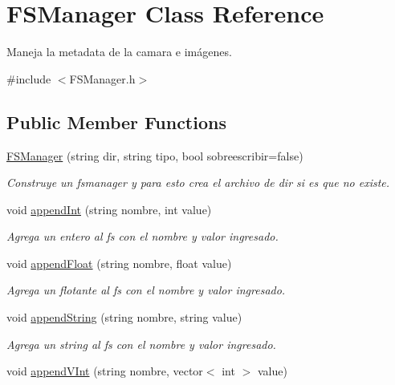 \hypertarget{classFSManager}{}\section{F\+S\+Manager Class Reference}
\label{classFSManager}


Maneja la metadata de la camara e imágenes.  




{\ttfamily \#include $<$F\+S\+Manager.\+h$>$}

\subsection*{Public Member Functions}
\begin{DoxyCompactItemize}
\item 
\mbox{\hyperlink{classFSManager_a6332022070523e78abdb3371fdb5befb}{F\+S\+Manager}} (string dir, string tipo, bool sobreescribir=false)
\begin{DoxyCompactList}\small\item\em Construye un fsmanager y para esto crea el archivo de \textquotesingle{}dir\textquotesingle{} si es que no existe. \end{DoxyCompactList}\item 
void \mbox{\hyperlink{classFSManager_a3e4672be75f6edf00336adf883571963}{append\+Int}} (string nombre, int value)
\begin{DoxyCompactList}\small\item\em Agrega un entero al fs con el nombre y valor ingresado. \end{DoxyCompactList}\item 
void \mbox{\hyperlink{classFSManager_ae0719c62b330a8053d65fc519f1afb38}{append\+Float}} (string nombre, float value)
\begin{DoxyCompactList}\small\item\em Agrega un flotante al fs con el nombre y valor ingresado. \end{DoxyCompactList}\item 
void \mbox{\hyperlink{classFSManager_a74dc93c38eb23abda9dd5651bf696c17}{append\+String}} (string nombre, string value)
\begin{DoxyCompactList}\small\item\em Agrega un string al fs con el nombre y valor ingresado. \end{DoxyCompactList}\item 
void \mbox{\hyperlink{classFSManager_a5c589c828a37b0d0231fd47436ba63b5}{append\+V\+Int}} (string nombre, vector$<$ int $>$ value)

\end{DoxyCompactItemize}
